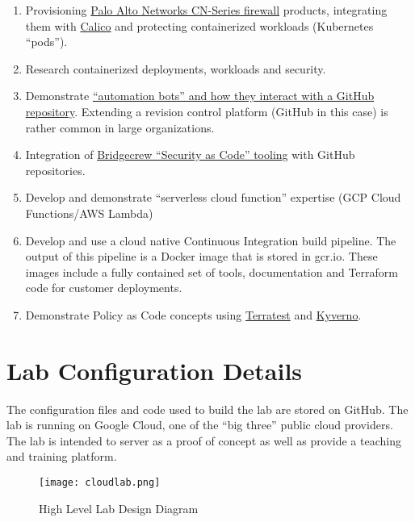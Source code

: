 \begin{raggedright}
	\begin{enumerate}
		\item Provisioning \href{https://docs.paloaltonetworks.com/cn-series.html}{Palo Alto Networks CN-Series firewall} products, integrating
		them with \href{https://www.tigera.io/project-calico/}{Calico} and protecting containerized workloads (Kubernetes ``pods'').
		\item Research containerized deployments, workloads and security.
		\item Demonstrate \href{https://github.com/probot/probot}{``automation bots'' and how they interact with a GitHub repository}. Extending a
		revision control platform (GitHub in this case) is rather common in large organizations.
		\item Integration of \href{https://docs.bridgecrew.io/docs}{Bridgecrew ``Security as Code'' tooling} with GitHub repositories.
		\item Develop and demonstrate ``serverless cloud function'' expertise (GCP Cloud Functions/AWS Lambda)
		\item Develop and use a cloud native Continuous Integration build pipeline. The output of this pipeline is a Docker image that is stored
		in gcr.io. These images include a fully contained set of tools, documentation and Terraform code for customer deployments.
		\item Demonstrate Policy as Code concepts using \href{https://www.accurics.com/products/terrascan/}{Terratest} and 
		\href{https://kyverno.io/}{Kyverno}.
	\end{enumerate}
\end{raggedright}
\vspace{2mm}

\section{\label{sec:Lab}Lab Configuration Details}
\vspace{2mm}
\justifying
The configuration files and code used to build the lab are stored on GitHub. The lab is running on Google Cloud, one of the ``big three'' public cloud providers.
The lab is intended to server as a proof of concept as well as provide a teaching and training platform.

\begin{figure}[ht]
  \texttt{[image: cloudlab.png]}
  \caption{High Level Lab Design Diagram}
  \label{design}
\end{figure}


